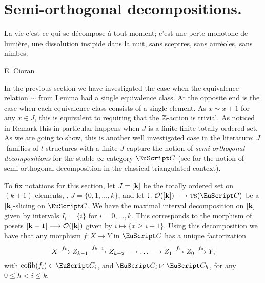 \section{Semi-orthogonal decompositions.}\label{sec:sods}
\begin{modifyepigraph}{.9}
\epigraph{La vie c'est ce qui se décompose à tout moment; c'est une perte monotone de lumière, une dissolution insipide dans la nuit, sans sceptres, sans auréoles, sans nimbes.}{E. Cioran}
\end{modifyepigraph}

In the previous section we have investigated the case when the equivalence relation $\sim$ from Lemma  had a single equivalence class.
At the opposite end is the case when each equivalence class consists of a single element. As $x\sim x+1$ for any $x\in J$, this is equivalent to requiring that the $\mathbb{Z}$-action is trivial. As noticed in Remark  this in particular happens when $J$ is a finite finite totally ordered set.
 As we are going to show, this is another well investigated case in the literature: $J$-families of $t$-structures with a finite $J$ capture %
  the notion of \emph{semi-orthogonal decompositions} for the stable $\infty$-category $\C$ (see \cite{Bondal1995, Kuz} for the notion of semi-orthogonal decomposition in the classical triangulated context).

To fix notations for this section, let $J=[\mathbf{k}]$ be the totally ordered set on $(k+1)$ elements, \ie, $J=\{0,1,\dots,k\}$, and let $\tee\colon \mathcal{O}(\ordered{k})\to \ts(\C)$ be a $[\mathbf{k}]$-slicing on $\C$. We have the maximal interval decomposition on $[\mathbf{k}]$ given by intervals $I_i=\{i\}$ for $i=0,\dots,k$. This corresponds to the morphism of posets $[\mathbf{k-1}]\longrightarrow \mathcal{O}([\mathbf{k}])$ given by $i\mapsto \{x\geq i+1\}$.  Using this decomposition we have that any morphism $f\colon X\to Y$ in $\C$ has a unique factorization
\[
X \xto{f_{k}} Z_{k-1} \xto{f_{k-1}}Z_{{k-2}}\to\dots\to Z_{{1}} \xto{f_1} Z_{0} \xto{f_0} Y,
\]
with $\cofib(f_i)\in \C_i$, and $\C_i\orth \C_h$, for any $0\leq h <i\leq k$. 

